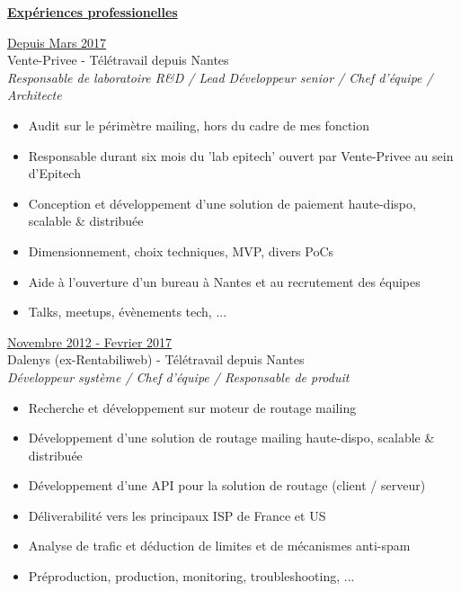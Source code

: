 \documentclass[a4paper,10pt]{letter}
\begin{document}
	\underline{\textbf{Exp\'eriences professionelles}}\\
		\begin{description}
			\item{\underline{Depuis Mars 2017}}\\
                Vente-Privee - T\'el\'etravail depuis Nantes\\
				\textit{Responsable de laboratoire R\&D / Lead D\'eveloppeur senior / Chef d'\'equipe / Architecte}
				\begin{itemize}
					\item Audit sur le p\'erim\`etre mailing, hors du cadre de mes fonction
					\item Responsable durant six mois du 'lab epitech' ouvert par Vente-Privee au sein d'Epitech
					\item Conception et d\'eveloppement d'une solution de paiement haute-dispo, scalable \& distribu\'ee
					\item Dimensionnement, choix techniques, MVP, divers PoCs
					\item Aide \`a l'ouverture d'un bureau \`a Nantes et au recrutement des \'equipes
					\item Talks, meetups, \'ev\`enements tech, ...\\
				\end{itemize}

			\item{\underline{Novembre 2012 - Fevrier 2017}}\\
                Dalenys (ex-Rentabiliweb) - T\'el\'etravail depuis Nantes\\
				\textit{D\'eveloppeur syst\`eme / Chef d'\'equipe / Responsable de produit}
				\begin{itemize}
					\item Recherche et d\'eveloppement sur moteur de routage mailing
                	\item D\'eveloppement d'une solution de routage mailing haute-dispo, scalable \& distribu\'ee
                    \item D\'eveloppement d'une API pour la solution de routage (client / serveur)
                    \item D\'eliverabilit\'e vers les principaux ISP de France et US
                    \item Analyse de trafic et d\'eduction de limites et de m\'ecanismes anti-spam
                    \item Pr\'eproduction, production, monitoring, troubleshooting, ...\\
				\end{itemize}


\end{description}
\end{document}
